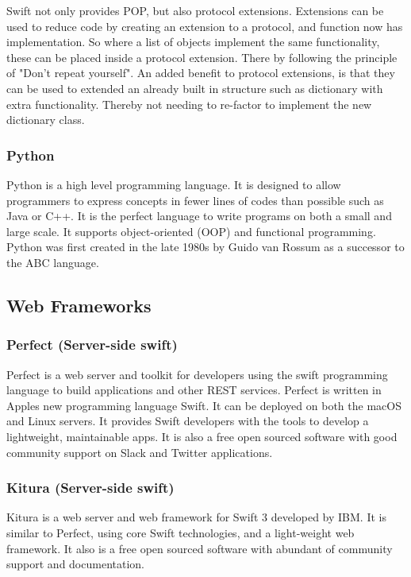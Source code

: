 Swift not only provides POP, but also protocol extensions. Extensions can be used to reduce code by creating an extension to a protocol, and function now has implementation. So where a list of objects implement the same functionality, these can be placed inside a protocol extension. There by following the principle of "Don't repeat yourself". \cite{repeat} An added benefit to protocol extensions, is that they can be used to extended an already built in structure such as dictionary with extra functionality. Thereby not needing to re-factor to implement the new dictionary class.

\subsubsection{Python}
Python \cite{python} is a high level programming language. It is designed to allow programmers to express concepts in fewer lines of codes than possible such as Java or C++. It is the perfect language to write programs on both a small and large scale. It supports object-oriented (OOP) and functional programming. Python was first created in the late 1980s by Guido van Rossum as a successor to the ABC language.

\subsection{Web Frameworks}

\subsubsection{Perfect (Server-side swift)}
Perfect \cite{perfect} is a web server and toolkit for developers using the swift programming language to build applications and other REST services. Perfect is written in Apples new programming language Swift. It can be deployed on both the macOS and Linux servers. It provides Swift developers with the tools to develop a lightweight, maintainable apps. It is also a free open sourced software with good community support on Slack and Twitter applications.

\subsubsection{Kitura (Server-side swift)}
Kitura \cite{kitura} is a web server and web framework for Swift 3 developed by IBM. It is similar to Perfect, using core Swift technologies, and a light-weight web framework. It also is a free open sourced software with abundant of community support and documentation.

